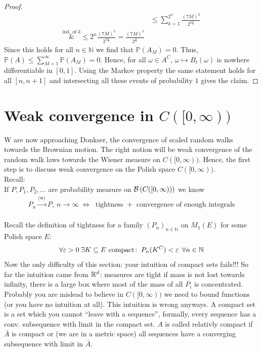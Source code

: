 \begin{proof}
\begin{align*}
		&\leq \sum_{k=1}^{2^n} \frac{(7M)^3}{2^{3\frac{n}{2}}} \\
		\overset{\text{ind. of }k}&{\leq} 2^n \frac{(7M)^3}{2^{3\frac{n}{2}}} = \frac{(7M)^3}{2^{\frac{n}{2}}}
	\end{align*}
	Since this holds for all $n\in \mathbb{N}$ we find that $\mathbb{P}(A_M) = 0$. Thus, $\mathbb{P}(A) \leq \sum_{M=1}^{\infty} \mathbb{P}(A_M) =  0$. Hence, for all $\omega \in A^C$, $\omega \mapsto B_t(\omega)$ is nowhere differentiable in $[0,1]$. Using the Markov property the same statement holds for all $[n,n+1]$ and intersecting all these events of probability $1$ gives the claim.
\end{proof}

\section{Weak convergence in $C([0,\infty))$}
W are now approaching Donkser, the convergence of scaled random walks towards the Brownian motion. The right notion will be weak convergence of the random walk laws towards the Wiener measure on $C([0,\infty))$. Hence, the first step is to discuss weak convergence on the Polish space $C([0,\infty))$.\\
Recall:\\
If $P,P_1,P_2,...$ are probability measure on $\mathcal{B}\left( C([0,\infty))\right)$ we know 
\begin{align*}
	P_n \overset{\text{(w)}}{\longrightarrow} P, \: n\to\infty \: \Leftrightarrow \: \text{ tightness }+ \text{ convergence of enough integrals}
\end{align*}
\underline{\smash{Tightness of measures on $C([0,\infty))$}}\\
Recall the definition of tightness for a family $(P_n)_{n\in\mathbb{N}}$ on $M_1(E)$ for some Polish space $E$:
\begin{align*}
	\forall \varepsilon > 0 \: \exists K \subseteq E \text{ compact}\colon \: P_n(K^C) < \varepsilon \: \: \forall n \in \mathbb{N}
\end{align*}
Now the only difficulty of this section: your intuition of compact sets fails!!! So far the intuition came from $\mathbb{R}^d$: measures are tight if mass is not lost towards infinity, there is a large box where most of the mass of all $P_i$ is concentrated. Probably you are mislead to believe in $C([0,\infty))$ we need to bound functions (or you have no intuition at all). This intuition is wrong anyways. A compact set is a set which you cannot \enquote{leave with a sequence}, formally, every sequence has a conv. subsequence with limit in the compact set. $A$ is called relativly compact if $\bar{A}$ is compact or (we are in a metric space) all sequences have a converging subsequence with limit in $\bar{A}$.
